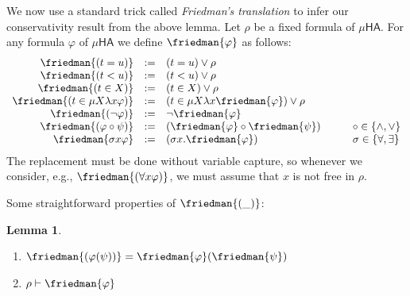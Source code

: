 \documentclass[10pt,a4paper]{amsart}
\theoremstyle{plain}
\newtheorem{lemma}[lemma]{Lemma}
\theoremstyle{definition}
\renewcommand{\phi}{\varphi}
\newcommand{\dfn}{:=}
\theoremstyle{plain}
\theoremstyle{definition} %
\newcommand{\HA}{\mathsf{HA}}
\newcommand{\muHA}{\mu\HA}
\begin{document}
We now use a standard trick called \emph{Friedman's translation} to infer our conservativity result from the above lemma. Let $\rho$ be a fixed formula of $\muHA$. For any formula $\phi$ of $\muHA$ we define $\friedman{\phi}$ as follows:
\[
\begin{array}{rcll}
    \friedman{(t=u)}  &  \dfn  & (t=u) \vee \rho\\
    \friedman{(t<u)}  &  \dfn  & (t<u) \vee \rho\\
    \friedman{(t \in X)}  &  \dfn  & (t \in X) \vee \rho\\
    \friedman{(t \in \mu X \lambda x\phi)}  &  \dfn  & (t \in \mu X\lambda x\friedman{\phi}) \vee \rho\\
   \friedman{(\neg \phi)}  & \dfn & \neg \friedman{\phi}\\
    \friedman{( \phi \circ \psi)}  & \dfn & ( \friedman{\phi}\circ \friedman{\psi})& \qquad \circ \in \{\wedge, \vee\}\\
    \friedman{\sigma x\phi} &\dfn & (\sigma x. \friedman{\phi}) &\qquad \sigma \in \{\forall, \exists\}
 \end{array}
\]
 The replacement must be done without variable capture, so whenever we consider, e.g., $\friedman{(\forall x \phi)}$, we must assume that $x$ is not free in $\rho$. 

Some straightforward properties of $\friedman{(\_)}$:
 \begin{lemma}{\ }\label{lem:friedman}
 \begin{enumerate}
     \item \label{lem:friedman1} $ \friedman{(\phi(\psi))}=\friedman{\phi}(\friedman{\psi})$
     \item \label{lem:friedman2}$\rho \vdash \friedman{\phi}$
 \end{enumerate}
 \end{lemma}
\end{document}
